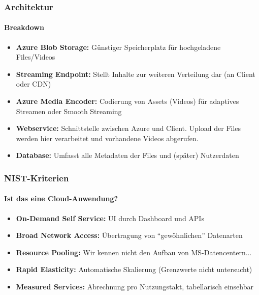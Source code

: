 \documentclass[aspectratio=169]{beamer}
\begin{document}
\begin{frame}
  \frametitle{Architektur}
  \framesubtitle{Breakdown}
  \begin{itemize}
    \item \textbf{Azure Blob Storage:} Günstiger Speicherplatz für hochgeladene Files/Videos
    \item \textbf{Streaming Endpoint:} Stellt Inhalte zur weiteren Verteilung dar (an Client oder CDN)
    \item \textbf{Azure Media Encoder:} Codierung von Assets (Videos) für adaptives Streamen oder Smooth Streaming
    \item \textbf{Webservice:} Schnittstelle zwischen Azure und Client. Upload der Files werden hier verarbeitet und vorhandene Videos abgerufen.
    \item \textbf{Database:} Umfasst alle Metadaten der Files und (später) Nutzerdaten
  \end{itemize}
\end{frame}

\begin{frame}
  \frametitle{NIST-Kriterien}
  \framesubtitle{Ist das eine Cloud-Anwendung?}
  \begin{itemize}
    \item \textbf{On-Demand Self Service:} UI durch Dashboard und APIs
    \item \textbf{Broad Network Access:} Übertragung von ``gewöhnlichen'' Datenarten
    \item \textbf{Resource Pooling:} Wir kennen nicht den Aufbau von MS-Datencentern...
    \item \textbf{Rapid Elasticity:} Automatische Skalierung (Grenzwerte nicht untersucht)
    \item \textbf{Measured Services:} Abrechnung pro Nutzungstakt, tabellarisch einsehbar
    \end{itemize}
\end{frame}
\end{document}
